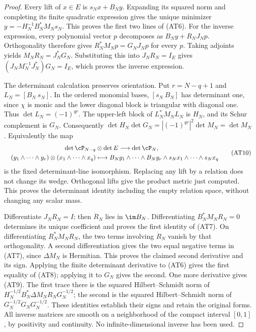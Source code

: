 \documentclass[11pt,a4paper]{article}
\begin{document}
\begin{proof}
Every lift of $x\in E$ is $s_Nx+B_Ny$. Expanding its squared norm
and completing its finite quadratic expression gives the unique
minimizer $y=-H_N^{-1}B_N^*M_Ns_N$. This proves the first two
lines of (AT6). For the inverse expression, every polynomial vector
$p$ decomposes as $B_Ny+R_NJ_Np$. Orthogonality therefore gives
$R_N^*M_Np=G_NJ_Np$ for every $p$. Taking adjoints yields
$M_NR_N=J_N^*G_N$. Substituting this into $J_NR_N=I_E$ gives
$(J_NM_N^{-1}J_N^*)G_N=I_E$, which proves the inverse expression.

The determinant calculation preserves orientation. Put
$r=N-q+1$ and $L_N=[B_N\ s_N]$. In the ordered monomial bases,
$[s_N\ B_N]$ has determinant one, since $\chi$ is monic and the
lower diagonal block is triangular with diagonal one. Thus
$\det L_N=(-1)^{qr}$. The upper-left block of $L_N^*M_NL_N$
is $H_N$, and its Schur complement is $G_N$. Consequently
$\det H_N\det G_N=|(-1)^{qr}|^2\det M_N=\det M_N$.
Equivalently the map
\[
 \begin{gathered}
 \det\cP_{N-q}\otimes\det E\longrightarrow\det\cP_N,\\
 \quad (y_1\wedge\cdots\wedge y_r)\otimes(x_1\wedge\cdots\wedge x_q)
 \longmapsto
 B_Ny_1\wedge\cdots\wedge B_Ny_r\wedge s_Nx_1\wedge\cdots\wedge s_Nx_q
 \end{gathered}
                                                        \tag{AT10}
\]
is the fixed determinant-line isomorphism. Replacing any lift by a
relation does not change its wedge. Orthogonal lifts give the product
metric just computed. This proves the determinant identity including
the empty relation space, without changing any scalar mass.

Differentiate $J_NR_N=I$; then $\dot R_N$ lies in $\im B_N$.
Differentiating $B_N^*M_NR_N=0$ determines its unique coefficient
and proves the first identity of (AT7). On differentiating
$R_N^*M_NR_N$, the two terms involving $\dot R_N$ vanish by
that orthogonality. A second differentiation gives the two equal
negative terms in (AT7), since $\Delta M_N$ is Hermitian. This
proves the claimed second derivative and its sign. Applying the
finite determinant derivative to (AT6) gives the first equality
of (AT8); applying it to $G_N$ gives the second.
One more derivative gives (AT9). The first trace there is the squared
Hilbert--Schmidt norm of
$H_N^{-1/2}B_N^*\Delta M_NR_NG_N^{-1/2}$; the second is the
squared Hilbert--Schmidt norm of
$G_N^{-1/2}\dot G_NG_N^{-1/2}$. These identities establish their
signs and retain the original forms. All inverse matrices are smooth
on a neighborhood of the compact interval $[0,1]$, by positivity
and continuity. No infinite-dimensional inverse has been used.
\end{proof}
\end{document}
